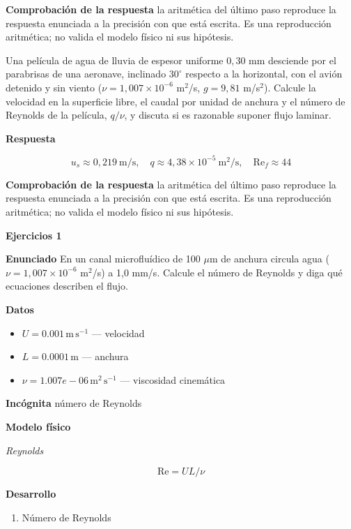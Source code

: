 \documentclass[10pt,openany]{book}
\begin{document}
\noindent\textbf{Comprobación de la respuesta} la aritmética del último paso reproduce la respuesta enunciada a la precisión con que está escrita. Es una reproducción aritmética; no valida el modelo físico ni sus hipótesis.

Una película de agua de lluvia de espesor uniforme \(0{,}30\) mm desciende por el parabrisas de una aeronave, inclinado \(30^\circ\) respecto a la horizontal, con el avión detenido y sin viento (\(\nu = 1{,}007\times 10^{-6}\) m\(^2\)/s, \(g = 9{,}81\) m/s\(^2\)). Calcule la velocidad en la superficie libre, el caudal por unidad de anchura y el número de Reynolds de la película, \(q/\nu\), y discuta si es razonable suponer flujo laminar.

\noindent\textbf{Respuesta}

\[
u_s \approx 0{,}219\ \mathrm{m/s},\quad q \approx 4{,}38\times 10^{-5}\ \mathrm{m^{2}/s},\quad \mathrm{Re}_f \approx 44
\]

\noindent\textbf{Comprobación de la respuesta} la aritmética del último paso reproduce la respuesta enunciada a la precisión con que está escrita. Es una reproducción aritmética; no valida el modelo físico ni sus hipótesis.

\noindent\textbf{Ejercicios 1}

\noindent\textbf{Enunciado}
En un canal microfluídico de 100 \(\mu\)m de anchura circula agua (\(\nu = 1{,}007\times 10^{-6}\) m\(^2\)/s) a 1,0 mm/s. Calcule el número de Reynolds y diga qué ecuaciones describen el flujo.

\noindent\textbf{Datos}
\begin{itemize}
\item $U = 0.001\,\mathrm{m}\,\mathrm{s}^{-1}$ — velocidad
\item $L = 0.0001\,\mathrm{m}$ — anchura
\item $\nu = 1.007e-06\,\mathrm{m}^{2}\,\mathrm{s}^{-1}$ — viscosidad cinemática
\end{itemize}

\noindent\textbf{Incógnita}
número de Reynolds

\noindent\textbf{Modelo físico}

\noindent\textit{Reynolds}

\[
\mathrm{Re} = U L/\nu
\]

\noindent\textbf{Desarrollo}
\begin{enumerate}
\item
Número de Reynolds
\end{enumerate}
\end{document}
